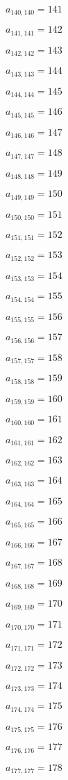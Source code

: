 \documentclass[a4paper,12pt]{article}
\begin{document}
$a _{ 140, 140 } = 141$

$a _{ 141, 141 } = 142$

$a _{ 142, 142 } = 143$

$a _{ 143, 143 } = 144$

$a _{ 144, 144 } = 145$

$a _{ 145, 145 } = 146$

$a _{ 146, 146 } = 147$

$a _{ 147, 147 } = 148$

$a _{ 148, 148 } = 149$

$a _{ 149, 149 } = 150$

$a _{ 150, 150 } = 151$

$a _{ 151, 151 } = 152$

$a _{ 152, 152 } = 153$

$a _{ 153, 153 } = 154$

$a _{ 154, 154 } = 155$

$a _{ 155, 155 } = 156$

$a _{ 156, 156 } = 157$

$a _{ 157, 157 } = 158$

$a _{ 158, 158 } = 159$

$a _{ 159, 159 } = 160$

$a _{ 160, 160 } = 161$

$a _{ 161, 161 } = 162$

$a _{ 162, 162 } = 163$

$a _{ 163, 163 } = 164$

$a _{ 164, 164 } = 165$

$a _{ 165, 165 } = 166$

$a _{ 166, 166 } = 167$

$a _{ 167, 167 } = 168$

$a _{ 168, 168 } = 169$

$a _{ 169, 169 } = 170$

$a _{ 170, 170 } = 171$

$a _{ 171, 171 } = 172$

$a _{ 172, 172 } = 173$

$a _{ 173, 173 } = 174$

$a _{ 174, 174 } = 175$

$a _{ 175, 175 } = 176$

$a _{ 176, 176 } = 177$

$a _{ 177, 177 } = 178$
\end{document}
